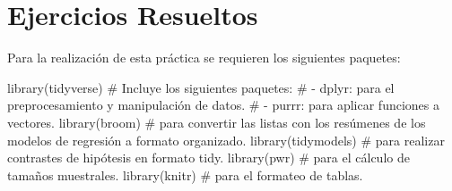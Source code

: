 \documentclass[
  a4paper,
]{scrreport}
\newenvironment{Shaded}{\begin{snugshade}}{\end{snugshade}}
\newcommand{\CommentTok}[1]{\textcolor[rgb]{0.37,0.37,0.37}{#1}}
\newcommand{\FunctionTok}[1]{\textcolor[rgb]{0.28,0.35,0.67}{#1}}
\newcommand{\NormalTok}[1]{\textcolor[rgb]{0.00,0.23,0.31}{#1}}
\theoremstyle{definition}
\theoremstyle{remark}
\begin{document}
\hypertarget{ejercicios-resueltos-7}{%
\section{Ejercicios Resueltos}\label{ejercicios-resueltos-7}}

Para la realización de esta práctica se requieren los siguientes
paquetes:

\begin{Shaded}
\begin{Highlighting}[]
\FunctionTok{library}\NormalTok{(tidyverse)}
\CommentTok{\# Incluye los siguientes paquetes:}
\CommentTok{\# {-} dplyr: para el preprocesamiento y manipulación de datos.}
\CommentTok{\# {-} purrr: para aplicar funciones a vectores.}
\FunctionTok{library}\NormalTok{(broom) }\CommentTok{\# para convertir las listas con los resúmenes de los modelos de regresión a formato organizado.}
\FunctionTok{library}\NormalTok{(tidymodels) }\CommentTok{\# para realizar contrastes de hipótesis en formato tidy.}
\FunctionTok{library}\NormalTok{(pwr) }\CommentTok{\# para el cálculo de tamaños muestrales.}
\FunctionTok{library}\NormalTok{(knitr) }\CommentTok{\# para el formateo de tablas.}
\end{Highlighting}
\end{Shaded}
\end{document}
